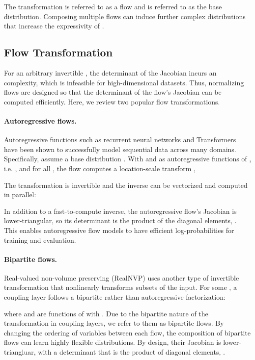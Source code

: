 \documentclass{article}
\begin{document}
The transformation  is referred to as a flow and  is referred to as the base distribution. Composing multiple flows can induce further complex distributions that increase the expressivity of  \citep{rezende2015variational, papamakarios2017masked}.

\subsection{Flow Transformation}

For an arbitrary invertible , the determinant of the Jacobian incurs an  complexity, which is infeasible for high-dimensional datasets. Thus, normalizing flows are designed so that the determinant of the flow's Jacobian can be computed efficiently. Here, we review two popular flow transformations.

\paragraph{Autoregressive flows.}
Autoregressive functions such as recurrent neural networks and Transformers \citep{vaswani2017attention} have been shown to successfully model sequential data across many domains.
Specifically, assume a base distribution . With  and  as autoregressive functions of , i.e. , and  for all , the flow computes a location-scale transform \citep{papamakarios2017masked, kingma2016improving},

The transformation is invertible and the inverse can be vectorized and computed in parallel:

In addition to a fast-to-compute inverse, the autoregressive flow's Jacobian is lower-triangular, so its determinant is the product of the diagonal elements, .
This enables autoregressive flow models to have efficient log-probabilities for training and evaluation.


\paragraph{Bipartite flows.}
Real-valued non-volume preserving (RealNVP) uses another type of invertible transformation \citep{dinh2017density} that nonlinearly transforms subsets of the input. For some , a coupling layer follows a bipartite rather than autoregressive factorization:

where  and  are functions of  with . Due to the bipartite nature of the transformation in coupling layers, we refer to them as bipartite flows. By changing the ordering of variables between each flow, the composition of bipartite flows can learn highly flexible distributions. By design, their Jacobian is lower-triangluar, with a determinant that is the product of diagonal elements, .
\end{document}
